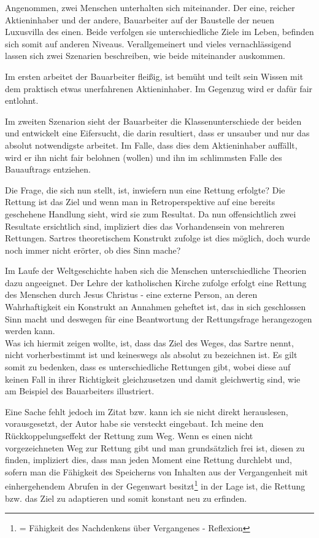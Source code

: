 \documentclass[12pt,a4paper,twoside]{article}
\begin{document}
  Angenommen, zwei Menschen unterhalten sich miteinander. Der eine, reicher Aktieninhaber und der andere, Bauarbeiter auf der Baustelle der neuen Luxusvilla des einen. Beide verfolgen sie unterschiedliche Ziele im Leben, befinden sich somit auf anderen Niveaus. Verallgemeinert und vieles vernachlässigend lassen sich zwei Szenarien beschreiben, wie beide miteinander auskommen. 
  
  Im ersten arbeitet der Bauarbeiter fleißig, ist bemüht und teilt sein Wissen mit dem praktisch etwas unerfahrenen Aktieninhaber. Im Gegenzug wird er dafür fair entlohnt. 
  
  Im zweiten Szenarion sieht der Bauarbeiter die Klassenunterschiede der beiden und entwickelt eine Eifersucht, die darin resultiert, dass er unsauber und nur das absolut notwendigste arbeitet. Im Falle, dass dies dem Aktieninhaber auffällt, wird er ihn nicht fair belohnen (wollen) und ihn im schlimmsten Falle des Bauauftrags entziehen.
  
  Die Frage, die sich nun stellt, ist, inwiefern nun eine Rettung erfolgte? Die Rettung ist das Ziel und wenn man in Retroperspektive auf eine bereits geschehene Handlung sieht, wird sie zum Resultat. Da nun offensichtlich zwei Resultate ersichtlich sind, impliziert dies das Vorhandensein von mehreren Rettungen. Sartres theoretischem Konstrukt zufolge ist dies möglich, doch wurde noch immer nicht erörter, ob dies Sinn mache? 
  
  Im Laufe der Weltgeschichte haben sich die Menschen unterschiedliche Theorien dazu angeeignet. Der Lehre der katholischen Kirche zufolge erfolgt eine Rettung des Menschen durch Jesus Christus - eine externe Person, an deren Wahrhaftigkeit ein Konstrukt an Annahmen geheftet ist, das in sich geschlossen Sinn macht und deswegen für eine Beantwortung der Rettungsfrage herangezogen werden kann. \\
  
  Was ich hiermit zeigen wollte, ist, dass das Ziel des Weges, das Sartre nennt, nicht vorherbestimmt ist und keineswegs als absolut zu bezeichnen ist. Es gilt somit zu bedenken, dass es unterschiedliche Rettungen gibt, wobei diese auf keinen Fall in ihrer Richtigkeit gleichzusetzen und damit gleichwertig sind, wie am Beispiel des Bauarbeiters illustriert. 
  
  Eine Sache fehlt jedoch im Zitat bzw. kann ich sie nicht direkt herauslesen, vorausgesetzt, der Autor habe sie versteckt eingebaut. Ich meine den Rückkoppelungseffekt der Rettung zum Weg. Wenn es einen nicht vorgezeichneten Weg zur Rettung gibt und man grundsätzlich frei ist, diesen zu finden, impliziert dies, dass man jeden Moment eine Rettung durchlebt und, sofern man die Fähigkeit des Speicherns von Inhalten aus der Vergangenheit mit einhergehendem Abrufen in der Gegenwart besitzt\footnote{= Fähigkeit des Nachdenkens über Vergangenes - Reflexion} in der Lage ist, die Rettung bzw. das Ziel zu adaptieren und somit konstant neu zu erfinden. \\
  
\end{document}

